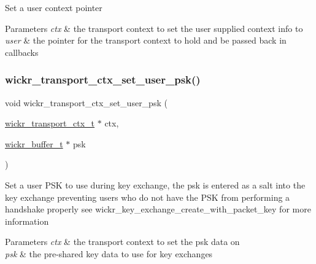 Set a user context pointer


\begin{DoxyParams}{Parameters}
{\em ctx} & the transport context to set the user supplied context info to \\
\hline
{\em user} & the pointer for the transport context to hold and be passed back in callbacks \\
\hline
\end{DoxyParams}
\mbox{\label{group__wickr__transport__ctx_ga0eaaa828e7130171bf859381757c8d92}} 
\subsubsection{\texorpdfstring{wickr\+\_\+transport\+\_\+ctx\+\_\+set\+\_\+user\+\_\+psk()}{wickr\_transport\_ctx\_set\_user\_psk()}}
{\footnotesize\ttfamily void wickr\+\_\+transport\+\_\+ctx\+\_\+set\+\_\+user\+\_\+psk (\begin{DoxyParamCaption}\item[{\hyperlink{structwickr__transport__ctx}{wickr\+\_\+transport\+\_\+ctx\+\_\+t} $\ast$}]{ctx,  }\item[{\hyperlink{structwickr__buffer}{wickr\+\_\+buffer\+\_\+t} $\ast$}]{psk }\end{DoxyParamCaption})}

Set a user P\+SK to use during key exchange, the psk is entered as a salt into the key exchange preventing users who do not have the P\+SK from performing a handshake properly see \textquotesingle{}wickr\+\_\+key\+\_\+exchange\+\_\+create\+\_\+with\+\_\+packet\+\_\+key\textquotesingle{} for more information


\begin{DoxyParams}{Parameters}
{\em ctx} & the transport context to set the psk data on \\
\hline
{\em psk} & the pre-\/shared key data to use for key exchanges \\
\hline
\end{DoxyParams}
\mbox{\label{group__wickr__transport__ctx_gaee74761e31d5f0a6fc97e2ccf5ac1e29}} 
